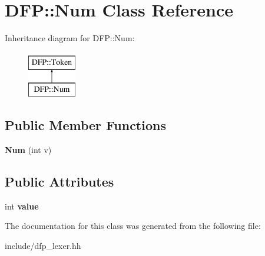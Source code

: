 \hypertarget{class_d_f_p_1_1_num}{}\section{D\+FP\+:\+:Num Class Reference}
\label{class_d_f_p_1_1_num}
Inheritance diagram for D\+FP\+:\+:Num\+:\begin{figure}[H]
\begin{center}
\leavevmode
\includegraphics[height=2.000000cm]{class_d_f_p_1_1_num}
\end{center}
\end{figure}
\subsection*{Public Member Functions}
\begin{DoxyCompactItemize}
\item 
{\bfseries Num} (int v)\hypertarget{class_d_f_p_1_1_num_ad35b157c13c9004407103fbc0d66dfc2}{}\label{class_d_f_p_1_1_num_ad35b157c13c9004407103fbc0d66dfc2}

\end{DoxyCompactItemize}
\subsection*{Public Attributes}
\begin{DoxyCompactItemize}
\item 
int {\bfseries value}\hypertarget{class_d_f_p_1_1_num_acd6d8cbedb4d8ca6ab7d71fe6243e90f}{}\label{class_d_f_p_1_1_num_acd6d8cbedb4d8ca6ab7d71fe6243e90f}

\end{DoxyCompactItemize}


The documentation for this class was generated from the following file\+:\begin{DoxyCompactItemize}
\item 
include/dfp\+\_\+lexer.\+hh\end{DoxyCompactItemize}
